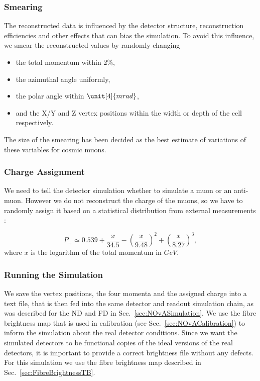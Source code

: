\subsubsection*{Smearing}
The reconstructed data is influenced by the detector structure, reconstruction efficiencies and other effects that can bias the simulation. To avoid this influence, we smear the reconstructed values by randomly changing
\begin{itemize}
\item the total momentum within 2\%,
\item the azimuthal angle uniformly,
\item the polar angle within $\unit[4]{mrad}$,
\item and the X/Y and Z vertex positions within the width or depth of the cell respectively.
\end{itemize}

The size of the smearing has been decided as the best estimate of variations of these variables for cosmic muons.

\subsubsection*{Charge Assignment}
We need to tell the detector simulation whether to simulate a muon or an anti-muon. However we do not reconstruct the charge of the muons, so we have to randomly assign it based on a statistical distribution from external measurements \cite{NOvA-doc-51327}:


\begin{equation}
P_+ \simeq 0.539 + \frac{x}{34.5}-\left(\frac{x}{9.48}\right)^2 + \left(\frac{x}{8.27}\right)^3,
\end{equation}
where $x$ is the logarithm of the total momentum in $\unit{GeV}$.

\subsubsection*{Running the Simulation}
We save the vertex positions, the four momenta and the assigned charge into a text file, that is then fed into the same detector and readout simulation chain, as was described for the \gls{ND} and \gls{FD} in Sec.~\ref{sec:NOvASimulation}.  We use the fibre brightness map that is used in calibration (see Sec.~\ref{sec:NOvACalibration}) to inform the simulation about the real detector conditions. Since we want the simulated detectors to be functional copies of the ideal versions of the real detectors, it is important to provide a correct brightness file without any defects. For this simulation we use the fibre brightness map described in Sec.~\ref{sec:FibreBrightnessTB}.

